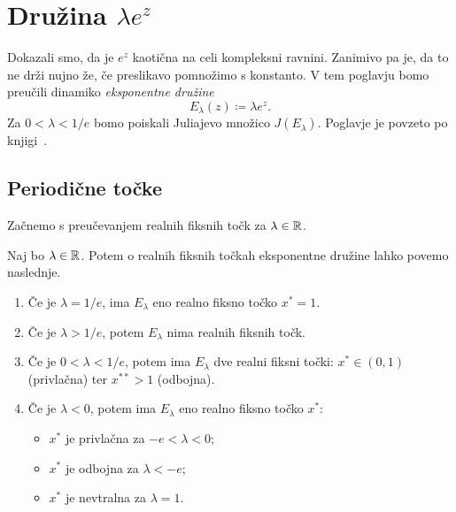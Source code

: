 \section{Družina \texorpdfstring{\(\lambda e^z\)}{\lambda exp(z)}}

Dokazali smo, da je \(e^z\) kaotična na celi kompleksni ravnini. Zanimivo pa je, da to ne drži nujno že, če preslikavo pomnožimo s konstanto. V tem poglavju bomo preučili dinamiko \emph{eksponentne družine}
\[E_\lambda (z) \coloneq \lambda e^z.\]
Za \(0 < \lambda < 1/e\) bomo poiskali Juliajevo množico \(J (E_\lambda)\). Poglavje je povzeto po knjigi~\cite[poglavje 9]{Pineiro_2025}.

\subsection{Periodične točke}

Začnemo s preučevanjem realnih fiksnih točk za \(\lambda \in \mathbb R\).

\begin{trditev}
    Naj bo \(\lambda \in \mathbb R\). Potem o realnih fiksnih točkah eksponentne družine lahko povemo naslednje.
    \begin{enumerate}[label=(\arabic*)]
        \item Če je \(\lambda = 1/e\), ima \(E_\lambda\) eno realno fiksno točko \(x^* = 1\).
        \item Če je \(\lambda > 1/e\), potem \(E_\lambda\) nima realnih fiksnih točk.
        \item Če je \(0 < \lambda < 1/e\), potem ima \(E_\lambda\) dve realni fiksni točki: \(x^* \in (0, 1)\) (privlačna) ter \(x^{**} > 1\) (odbojna).
        \item Če je \(\lambda < 0\), potem ima \(E_\lambda\) eno realno fiksno točko \(x^*\):
              \begin{itemize}
                  \item \(x^*\) je privlačna za \(-e < \lambda < 0\);
                  \item \(x^*\) je odbojna za \(\lambda < -e\);
                  \item \(x^*\) je nevtralna za \(\lambda = 1\).
              \end{itemize}
    \end{enumerate}
\end{trditev}

